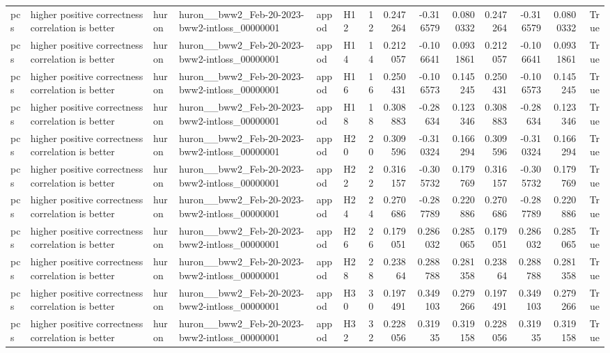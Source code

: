 \begin{longtable}{llllllrrrrrrrr}
pcs & higher positive correctness correlation is better & huron & huron\_\_bww2\_Feb-20-2023-bww2-intloss\_00000001 & appod & H12 & 12 & 0.247264 & -0.316579 & 0.0800332 & 0.247264 & -0.316579 & 0.0800332 & True \\
pcs & higher positive correctness correlation is better & huron & huron\_\_bww2\_Feb-20-2023-bww2-intloss\_00000001 & appod & H14 & 14 & 0.212057 & -0.106641 & 0.0931861 & 0.212057 & -0.106641 & 0.0931861 & True \\
pcs & higher positive correctness correlation is better & huron & huron\_\_bww2\_Feb-20-2023-bww2-intloss\_00000001 & appod & H16 & 16 & 0.250431 & -0.106573 & 0.145245 & 0.250431 & -0.106573 & 0.145245 & True \\
pcs & higher positive correctness correlation is better & huron & huron\_\_bww2\_Feb-20-2023-bww2-intloss\_00000001 & appod & H18 & 18 & 0.308883 & -0.28634 & 0.123346 & 0.308883 & -0.28634 & 0.123346 & True \\
pcs & higher positive correctness correlation is better & huron & huron\_\_bww2\_Feb-20-2023-bww2-intloss\_00000001 & appod & H20 & 20 & 0.309596 & -0.310324 & 0.166294 & 0.309596 & -0.310324 & 0.166294 & True \\
pcs & higher positive correctness correlation is better & huron & huron\_\_bww2\_Feb-20-2023-bww2-intloss\_00000001 & appod & H22 & 22 & 0.316157 & -0.305732 & 0.179769 & 0.316157 & -0.305732 & 0.179769 & True \\
pcs & higher positive correctness correlation is better & huron & huron\_\_bww2\_Feb-20-2023-bww2-intloss\_00000001 & appod & H24 & 24 & 0.270686 & -0.287789 & 0.220886 & 0.270686 & -0.287789 & 0.220886 & True \\
pcs & higher positive correctness correlation is better & huron & huron\_\_bww2\_Feb-20-2023-bww2-intloss\_00000001 & appod & H26 & 26 & 0.179051 & 0.286032 & 0.285065 & 0.179051 & 0.286032 & 0.285065 & True \\
pcs & higher positive correctness correlation is better & huron & huron\_\_bww2\_Feb-20-2023-bww2-intloss\_00000001 & appod & H28 & 28 & 0.23864 & 0.288788 & 0.281358 & 0.23864 & 0.288788 & 0.281358 & True \\
pcs & higher positive correctness correlation is better & huron & huron\_\_bww2\_Feb-20-2023-bww2-intloss\_00000001 & appod & H30 & 30 & 0.197491 & 0.349103 & 0.279266 & 0.197491 & 0.349103 & 0.279266 & True \\
pcs & higher positive correctness correlation is better & huron & huron\_\_bww2\_Feb-20-2023-bww2-intloss\_00000001 & appod & H32 & 32 & 0.228056 & 0.31935 & 0.319158 & 0.228056 & 0.31935 & 0.319158 & True \\

\end{longtable}
